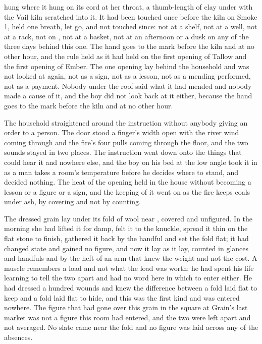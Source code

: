  hung where it hung on its cord at her throat, a thumb-length of clay under  with the Vail kiln scratched into it. It had been touched once before the kiln on Smoke 1, held one breath, let go, and not touched since: not at a shelf, not at a well, not at a rack, not on , not at a basket, not at an afternoon or a dusk on any of the three days behind this one. The hand goes to the mark before the kiln and at no other hour, and the rule held as it had held on the first opening of Tallow and the first opening of Ember. The one opening lay behind the household and was not looked at again, not as a sign, not as a lesson, not as a mending performed, not as a payment. Nobody under the roof said what it had mended and nobody made a cause of it, and the boy did not look back at it either, because the hand goes to the mark before the kiln and at no other hour.

The household straightened around the instruction without anybody giving an order to a person. The door stood a finger's width open with the river wind coming through and the fire's four pulls coming through the floor, and the two sounds stayed in two places. The instruction went down onto the things that could hear it and nowhere else, and the boy on his bed at the low angle took it in as a man takes a room's temperature before he decides where to stand, and decided nothing. The heat of the opening held in the house without becoming a lesson or a figure or a sign, and the keeping of it went on as the fire keeps coals under ash, by covering and not by counting.

The dressed grain lay under its fold of wool near , covered and unfigured. In the morning she had lifted it for damp, felt it to the knuckle, spread it thin on the flat stone to finish, gathered it back by the handful and set the fold flat; it had changed state and gained no figure, and now it lay as it lay, counted in glances and handfuls and by the heft of an arm that knew the weight and not the cost. A muscle remembers a load and not what the load was worth; he had spent his life learning to tell the two apart and had no word here in which to enter either. He had dressed a hundred wounds and knew the difference between a fold laid flat to keep and a fold laid flat to hide, and this was the first kind and was entered nowhere. The figure that had gone over this grain in the square at Grain's last market was not a figure this room had entered, and the two were left apart and not averaged. No slate came near the fold and no figure was laid across any of the absences.

